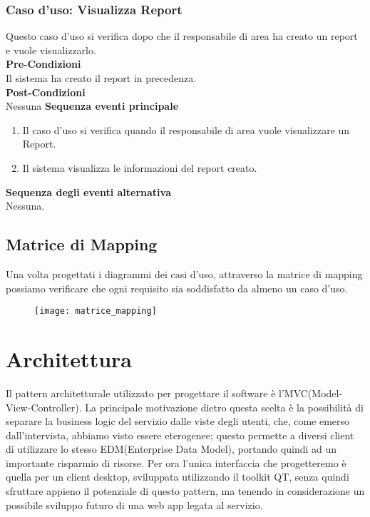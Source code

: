 \documentclass[green, fancy, 11pt]{elegantbook}
\begin{document}
\subsubsection{Caso d'uso: Visualizza Report}
\noindent
Questo caso d'uso si verifica dopo che il responsabile di area ha creato un report e vuole visualizzarlo.\\
\textbf{Pre-Condizioni}\\
Il sistema ha creato il report in precedenza.\\
\textbf{Post-Condizioni}\\
Nessuna
\textbf{Sequenza eventi principale}
\begin{enumerate}
	\item Il caso d'uso si verifica quando il responsabile di area vuole visualizzare un Report.
	\item Il sistema visualizza le informazioni del report creato.
\end{enumerate}
\textbf{Sequenza degli eventi alternativa}\\
Nessuna.
\newpage

{
\begin{landscape}
\subsection{Matrice di Mapping}
Una volta progettati i diagrammi dei casi d'uso, attraverso la matrice di mapping possiamo verificare che ogni requisito sia soddisfatto da almeno un caso d'uso.
\scriptsize
\begin{figure}[H]
	\texttt{[image: matrice\_mapping]}
\end{figure}
\end{landscape}
}

\section{Architettura}
\noindent
Il pattern architetturale utilizzato per progettare il software è l'MVC(Model-View-Controller). La principale motivazione dietro questa scelta è la possibilità di separare la business logic del servizio dalle viste degli utenti, che, come emerso dall'intervista, abbiamo visto essere eterogenee; questo permette a diversi client di utilizzare lo stesso EDM(Enterprise Data Model), portando quindi ad un importante risparmio
di risorse. Per ora l'unica interfaccia che progetteremo è quella per un client desktop, sviluppata utilizzando il toolkit QT, senza quindi sfruttare appieno il potenziale di questo pattern, ma tenendo in considerazione un possibile sviluppo futuro di una web app legata al servizio.
\end{document}
